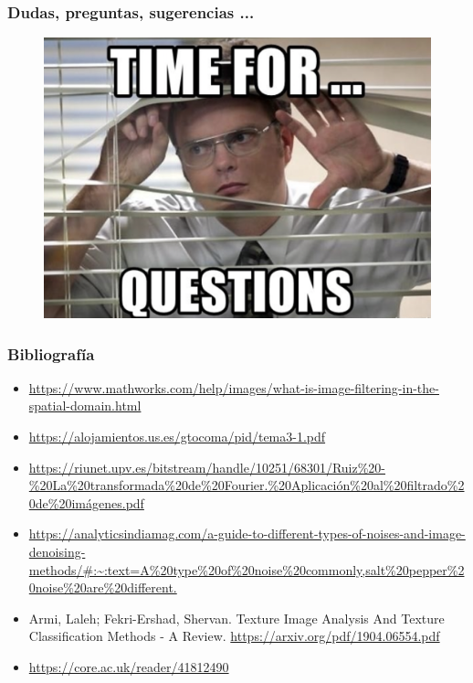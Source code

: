 \documentclass[
10pt, %
aspectratio=169, %
]{beamer}
\begin{document}
	\begin{frame}
		
		\frametitle{Dudas, preguntas, sugerencias ...}
		
		\begin{figure}[h]
			\centering
			\includegraphics[scale=0.5]{duda.png}
		\end{figure}
		
	\end{frame}	
	
	
	\begin{frame}
		
		\frametitle{Bibliografía}
		
		\begin{itemize}
			\item \url{https://www.mathworks.com/help/images/what-is-image-filtering-in-the-spatial-domain.html}		
			\item \url{https://alojamientos.us.es/gtocoma/pid/tema3-1.pdf}
			\item \url{https://riunet.upv.es/bitstream/handle/10251/68301/Ruiz\%20-\%20La\%20transformada\%20de\%20Fourier.\%20Aplicación\%20al\%20filtrado\%20de\%20imágenes.pdf}
			\item  \url{https://analyticsindiamag.com/a-guide-to-different-types-of-noises-and-image-denoising-methods/\#:~:text=A\%20type\%20of\%20noise\%20commonly,salt\%20pepper\%20noise\%20are\%20different.}
			\item Armi, Laleh; Fekri-Ershad, Shervan. Texture Image Analysis And Texture Classification Methods - A Review. \url{https://arxiv.org/pdf/1904.06554.pdf}
			\item \url{https://core.ac.uk/reader/41812490}
			
		\end{itemize}
		
	\end{frame}
	
	
	\begin{frame}
		\titlepage
	\end{frame}
	
	
	
\end{document}
